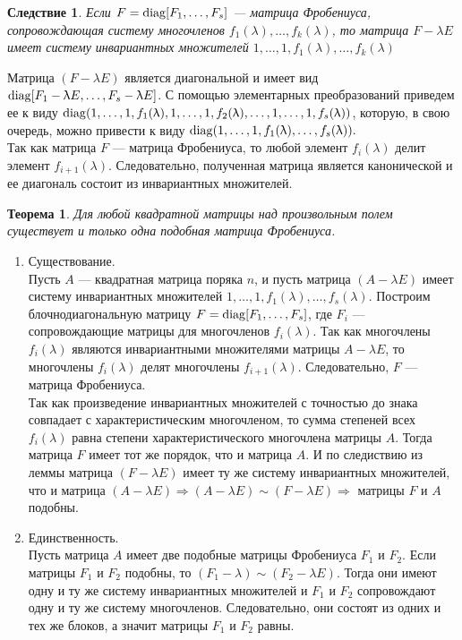 \newtheorem*{cor12_11_1}{Следствие}\begin{cor12_11_1}Если $F = \operatorname{diag} [F_1,\dots,F_s]$ --- матрица Фробениуса, сопровождающая систему многочленов $f_1(\lambda),\dots,f_k(\lambda)$, то матрица $F-\lambda E$ имеет систему инвариантных множителей $1,\dots,1,f_1(\lambda),\dots,f_k(\lambda)$
\end{cor12_11_1}\begin{Proof}
	Матрица $(F-\lambda E)$ является диагональной и имеет вид $\operatorname{diag} [F_1-\uplambda E,\dots,F_s-\uplambda E]$. С помощью элементарных преобразований приведем ее к виду $\operatorname{diag} (1,\dots,1,f_1(\uplambda),1,\dots,1,f_2(\uplambda),\dots,\\ 1,\dots,1,f_s(\uplambda))$, которую, в свою очередь, можно привести к виду $\operatorname{diag} (1,\dots,1,f_1(\uplambda),\dots,f_s(\uplambda)).$\\
	Так как матрица $F$ --- матрица Фробениуса, то любой элемент $f_i(\lambda)$ делит элемент $f_{i+1}(\lambda)$. Следовательно, полученная матрица является канонической и ее диагональ состоит из инвариантных множителей.
\end{Proof}
\newtheorem*{th12_11_1}{Теорема}\begin{th12_11_1}Для любой квадратной матрицы над произвольным полем существует и только одна подобная матрица Фробениуса.
\end{th12_11_1}\begin{Proof}\begin{enumerate}
		\item Существование.\\ Пусть $A$ --- квадратная матрица поряка $n$, и пусть матрица $(A-\lambda E)$ имеет систему инвариантных множителей $1,\dots,1,f_1(\lambda),\dots, f_s(\lambda)$. Построим блочнодиагональную матрицу $F = \operatorname{diag} [F_1,\dots,F_s]$, где $F_i$ --- сопровождающие матрицы для многочленов $f_i(\lambda)$. Так как многочлены $f_i(\lambda)$ являются инвариантными множителями матрицы $A-\lambda E$, то многочлены $f_i(\lambda)$ делят многочлены $f_{i+1}(\lambda)$. Следовательно, $F$ --- матрица Фробениуса.\\ Так как произведение инвариантных множителей с точностью до знака совпадает с характеристическим многочленом, то сумма степеней всех $f_i(\lambda)$ равна степени характеристического многочлена матрицы $A$. Тогда матрица $F$ имеет тот же порядок, что и матрица $A$. И по следиствию из леммы матрица $(F-\lambda E)$ имеет ту же систему инвариантных множителей, что и матрица $(A-\lambda E)\Rightarrow (A-\lambda E) \sim (F-\lambda E)\Rightarrow$ матрицы $F$ и $A$ подобны.\\
		\item Единственность.\\ Пусть матрица $A$ имеет две подобные матрицы Фробениуса $F_1$ и $F_2$. Если матрицы $F_1$ и $F_2$ подобны, то $(F_1-\lambda) \sim (F_2-\lambda E)$. Тогда они имеют одну и ту же систему инвариантных множителей и $F_1$ и $F_2$ сопровождают одну и ту же систему многочленов. Следовательно, они состоят из одних и тех же блоков, а значит матрицы $F_1$ и $F_2$ равны.
	\end{enumerate}
\end{Proof}\\ 
